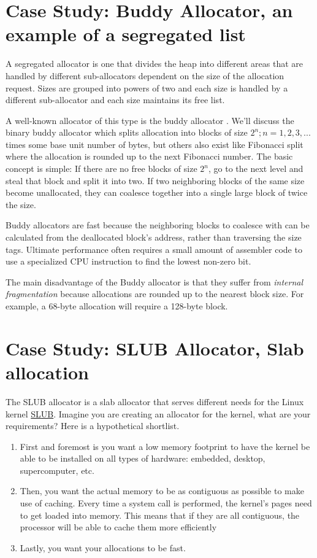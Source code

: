 \section{Case Study: Buddy Allocator, an example of a segregated list}

A segregated allocator is one that divides the heap into different areas that are handled by different sub-allocators dependent on the size of the allocation request.
Sizes are grouped into powers of two and each size is handled by a different sub-allocator and each size maintains its free list.

A well-known allocator of this type is the buddy allocator \cite[P. 85]{rangan1999foundations}.
We'll discuss the binary buddy allocator which splits allocation into blocks of size $2^n; n = 1, 2, 3, ...$ times some base unit number of bytes, but others also exist like Fibonacci split where the allocation is rounded up to the next Fibonacci number.
The basic concept is simple: If there are no free blocks of size $2^n$, go to the next level and steal that block and split it into two.
If two neighboring blocks of the same size become unallocated, they can coalesce together into a single large block of twice the size.

Buddy allocators are fast because the neighboring blocks to coalesce with can be calculated from the deallocated block's address, rather than traversing the size tags.
Ultimate performance often requires a small amount of assembler code to use a specialized CPU instruction to find the lowest non-zero bit.

The main disadvantage of the Buddy allocator is that they suffer from \emph{internal fragmentation} because allocations are rounded up to the nearest block size.
For example, a 68-byte allocation will require a 128-byte block.

\section{Case Study: SLUB Allocator, Slab allocation}

The SLUB allocator is a slab allocator that serves different needs for the Linux kernel \href{http://en.wikipedia.org/wiki/SLUB_\%28software\%29}{SLUB}.
Imagine you are creating an allocator for the kernel, what are your requirements?
Here is a hypothetical shortlist.

\begin{enumerate}
\item First and foremost is you want a low memory footprint to have the kernel be able to be installed on all types of hardware: embedded, desktop, supercomputer, etc.
\item Then, you want the actual memory to be as contiguous as possible to make use of caching. Every time a system call is performed, the kernel's pages need to get loaded into memory. This means that if they are all contiguous, the processor will be able to cache them more efficiently
\item Lastly, you want your allocations to be fast.
\end{enumerate}

